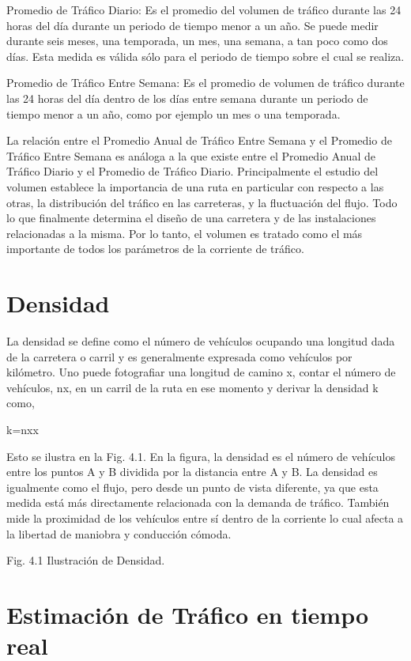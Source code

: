 \documentclass[final,fmstyle]{fpunathesis}
\begin{document}
Promedio de Tráfico Diario: Es el promedio del volumen de tráfico durante las 24 horas del día durante un periodo de tiempo menor a un año. Se puede medir durante seis meses, una temporada, un mes, una semana, a tan poco como dos días. Esta medida es válida sólo para el periodo de tiempo sobre el cual se realiza.

Promedio de Tráfico Entre Semana: Es el promedio de volumen de tráfico durante las 24 horas del día dentro de los días entre semana durante un periodo de tiempo menor a un año, como por ejemplo un mes o una temporada.

La relación entre el Promedio Anual de Tráfico Entre Semana y el Promedio de Tráfico Entre Semana es análoga a la que existe entre el Promedio Anual de Tráfico Diario y el Promedio de Tráfico Diario. Principalmente el estudio del volumen establece la importancia de una ruta en particular con respecto a las otras, la distribución del tráfico en las carreteras, y la fluctuación del flujo. Todo lo que finalmente determina el diseño de una carretera y de las instalaciones relacionadas a la misma. Por lo tanto, el volumen es tratado como el más importante de todos los parámetros de la corriente de tráfico.

\section{Densidad}

La densidad se define como el número de vehículos ocupando una longitud dada de la carretera o carril y es generalmente expresada como vehículos por kilómetro. Uno puede fotografiar una longitud de camino x, contar el número de vehículos, nx, en un carril de la ruta en ese momento y derivar la densidad k como,

k=nxx

Esto se ilustra en la Fig. 4.1. En la figura, la densidad es el número de vehículos entre los puntos A y B dividida por la distancia entre A y B. La densidad es igualmente como el flujo, pero desde un punto de vista diferente, ya que esta medida está más directamente relacionada con la demanda de tráfico. También mide la proximidad de los vehículos entre sí dentro de la corriente lo cual afecta a la libertad de maniobra y conducción cómoda.

Fig. 4.1 Ilustración de Densidad.

\section{Estimación de Tráfico en tiempo real}
\end{document}
